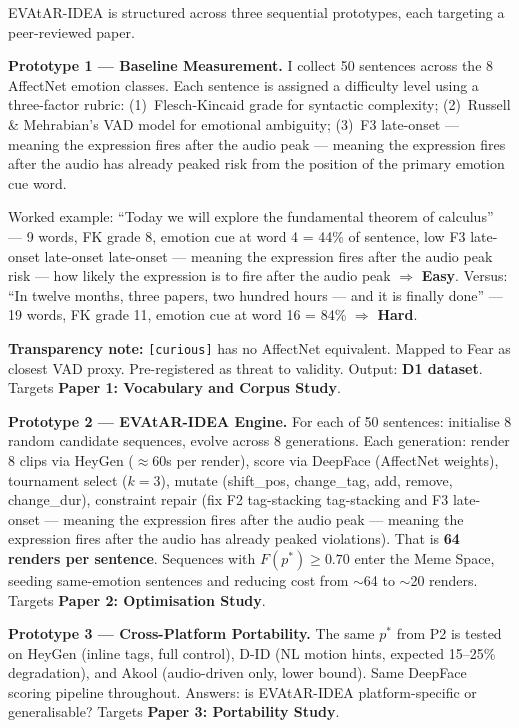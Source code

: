 \documentclass[12pt,a4paper]{article}
\begin{document}
\begin{speechbox}
EVAtAR-IDEA is structured across three sequential prototypes, each targeting a peer-reviewed paper.

\textbf{Prototype 1 --- Baseline Measurement.}
I collect 50 sentences across the 8 AffectNet emotion classes. Each sentence is assigned a
difficulty level using a three-factor rubric:
(1)~Flesch-Kincaid grade for syntactic complexity;
(2)~Russell \& Mehrabian's VAD model for emotional ambiguity;
(3)~F3 late-onset — meaning the expression fires after the audio peak — meaning the expression fires after the audio has already peaked risk from the position of the primary emotion cue word.

Worked example: ``Today we will explore the fundamental theorem of calculus'' --- 9 words,
FK grade 8, emotion cue at word 4 = 44\% of sentence, low F3 late-onset late-onset late-onset — meaning the expression fires after the audio peak risk — how likely the expression is to fire after the audio peak $\Rightarrow$ \textbf{Easy}.
Versus: ``In twelve months, three papers, two hundred hours --- and it is finally done'' ---
19 words, FK grade 11, emotion cue at word 16 = 84\% $\Rightarrow$ \textbf{Hard}.

\textbf{Transparency note:} \texttt{[curious]} has no AffectNet equivalent. Mapped to Fear
as closest VAD proxy. Pre-registered as threat to validity. Output: \textbf{D1 dataset}.
Targets \textbf{Paper 1: Vocabulary and Corpus Study}.

\textbf{Prototype 2 --- EVAtAR-IDEA Engine.}
For each of 50 sentences: initialise 8 random candidate sequences, evolve across 8 generations.
Each generation: render 8 clips via HeyGen ($\approx$60s per render), score via DeepFace
(AffectNet weights), tournament select ($k=3$), mutate (shift\_pos, change\_tag, add, remove,
change\_dur), constraint repair (fix F2 tag-stacking tag-stacking and F3 late-onset — meaning the expression fires after the audio peak — meaning the expression fires after the audio has already peaked violations). That is \textbf{64 renders per
sentence}. Sequences with $F(p^*) \geq 0.70$ enter the Meme Space, seeding same-emotion
sentences and reducing cost from $\sim$64 to $\sim$20 renders.
Targets \textbf{Paper 2: Optimisation Study}.

\textbf{Prototype 3 --- Cross-Platform Portability.}
The same $p^*$ from P2 is tested on HeyGen (inline tags, full control), D-ID (NL motion hints,
expected 15--25\% degradation), and Akool (audio-driven only, lower bound). Same DeepFace
scoring pipeline throughout. Answers: is EVAtAR-IDEA platform-specific or generalisable?
Targets \textbf{Paper 3: Portability Study}.
\end{speechbox}
\end{document}
